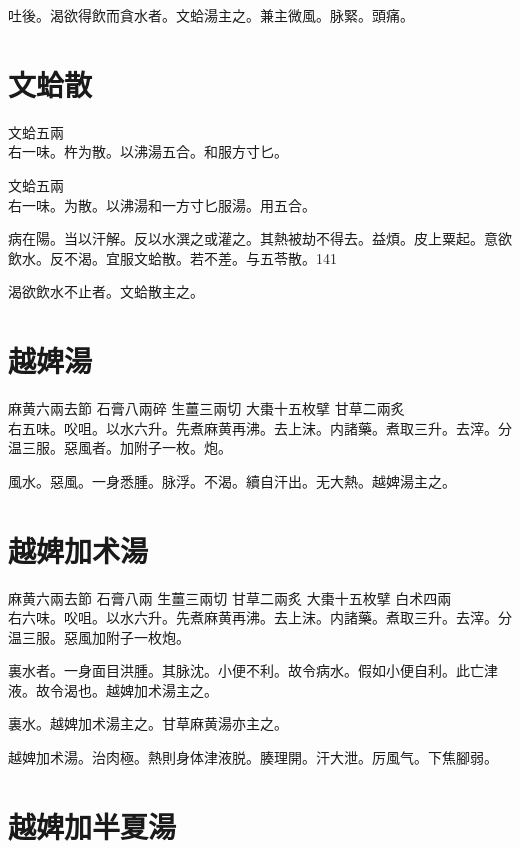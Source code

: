 吐後。渴欲得飲而貪水者。文蛤湯主之。兼主微風。脉緊。頭痛。

\section{文蛤散}

文蛤{\scriptsize 五兩}\\
右一味。杵为散。以沸湯五合。和服方寸匕。{\dengben}

文蛤{\scriptsize 五兩}\\
右一味。为散。以沸湯和一方寸匕服湯。用五合。{\zhaoben}

病在陽。当以汗解。反以水潠之或灌之。其熱被劫不得去。益煩。皮上粟起。意欲飲水。反不渴。宜服文蛤散。若不差。与五苓散。141

渴欲飲水不止者。文蛤散主之。

\section{越婢湯}

麻黄{\scriptsize 六兩去節} 石膏{\scriptsize 八兩碎} 生薑{\scriptsize 三兩切} 大棗{\scriptsize 十五枚擘} 甘草{\scriptsize 二兩炙}\\
右五味。㕮咀。以水六升。先煮麻黄再沸。去上沫。内諸藥。煮取三升。去滓。分温三服。惡風者。加附子一枚。炮。

風水。惡風。一身悉腫。脉浮。不渴。續自汗出。无大熱。越婢湯主之。

\section{越婢加术湯}

麻黄{\scriptsize 六兩去節} 石膏{\scriptsize 八兩} 生薑{\scriptsize 三兩切} 甘草{\scriptsize 二兩炙} 大棗{\scriptsize 十五枚擘} 白术{\scriptsize 四兩}\\
右六味。㕮咀。以水六升。先煮麻黄再沸。去上沫。内諸藥。煮取三升。去滓。分温三服。惡風加附子一枚炮。

裏水者。一身面目洪腫。其脉沈。小便不利。故令病水。假如小便自利。此亡津液。故令渴也。越婢加术湯主之。

裏水。越婢加术湯主之。甘草麻黄湯亦主之。

越婢加术湯。治肉極。熱則身体津{\khaaitp 液}脱。腠理開。汗大泄。厉風气。下焦腳弱。

\section{越婢加半夏湯}

